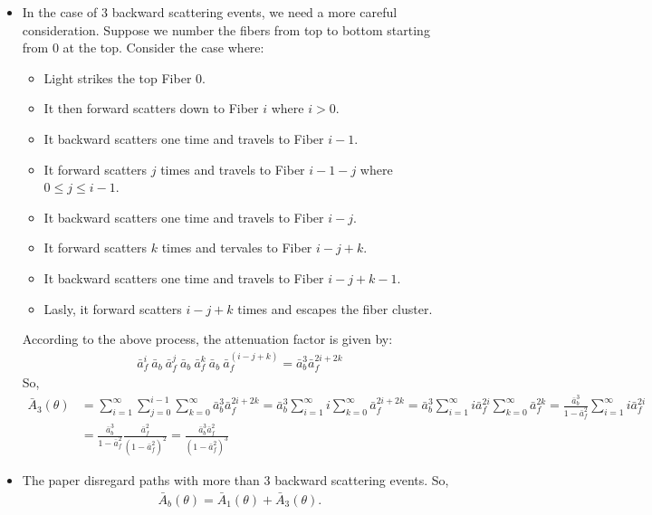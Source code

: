\documentclass[10pt]{article}
\begin{document}
\begin{itemize}
    \item In the case of $3$ backward scattering events, we need a more careful consideration.  Suppose we number the fibers from top to bottom starting from $0$ at the top.  Consider the case where:
    \begin{itemize}
      \item Light strikes the top Fiber $0$.
      \item It then forward scatters down to Fiber $i$ where $i > 0$.
      \item It backward scatters one time and travels to Fiber $i-1$.
      \item It forward scatters $j$ times and travels to Fiber $i-1-j$ where $0 \leq j \leq i-1$.
      \item It backward scatters one time and travels to Fiber $i-j$.
      \item It forward scatters $k$ times and tervales to Fiber $i-j+k$.
      \item It backward scatters one time and travels to Fiber $i-j+k-1$.
      \item Lasly, it forward scatters $i-j+k$ times and escapes the fiber cluster.
    \end{itemize}
    According to the above process, the attenuation factor is given by:
    \begin{align*}
      \bar{a}_f^{i}\ \bar{a}_b\ \bar{a}_f^{j}\ \bar{a}_b\ \bar{a}_f^{k}\ \bar{a}_b\ \bar{a}_f^{(i-j+k)}
      = \bar{a}_b^3 \bar{a}_f^{2i + 2k}
    \end{align*}
    So,
    \begin{align*}
      \bar{A}_3(\theta) 
      &= \sum_{i=1}^\infty \sum_{j=0}^{i-1} \sum_{k=0}^\infty \bar{a}_b^3 \bar{a}_f^{2i + 2k}
      = \bar{a}_b^3 \sum_{i=1}^\infty i \sum_{k=0}^\infty \bar{a}_f^{2i + 2k}
      = \bar{a}_b^3 \sum_{i=1}^\infty i \bar{a}_f^{2i} \sum_{k=0}^\infty \bar{a}_f^{2k}
      = \frac{\bar{a}_b^3}{1 - \bar{a}_f^2} \sum_{i=1}^\infty i \bar{a}_f^{2i} \\
      &= \frac{\bar{a}_b^3}{1 - \bar{a}_f^2} \frac{\bar{a}_f^2}{(1-\bar{a}_f^2)^2}
      = \frac{\bar{a}_b^3 \bar{a}_f^2}{(1 - \bar{a}_f^2)^3}    
    \end{align*}    

    \item The paper disregard paths with more than $3$ backward scattering events.  So,
    \begin{align*}
      \bar{A}_b(\theta) = \bar{A}_1(\theta) + \bar{A}_3(\theta).
    \end{align*}
  \end{itemize}
\end{document}
